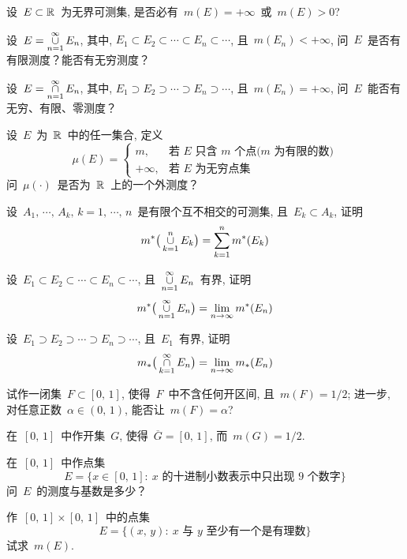 \begin{problemset}
\item 设~$E \subset \mathbb{R}$~为无界可测集, 是否必有~$m(E) = +\infty$~或~$m(E) > 0$?

\item 设~$E = \mathop{\cup}\limits_{n=1}^\infty E_n$, 其中, $E_1 \subset E_2 \subset \cdots \subset E_n \subset \cdots$, 且~$m(E_n) < +\infty$, 问~$E$~是否有有限测度？能否有无穷测度？

\item 设~$E = \mathop{\cap}\limits_{n=1}^\infty E_n$, 其中, $E_1 \supset E_2 \supset \cdots \supset E_n \supset \cdots$, 且~$m(E_n) = +\infty$, 问~$E$~能否有无穷、有限、零测度？

\item 设~$E$~为~$\mathbb{R}$~中的任一集合, 定义
\[
\mu(E) = \left\{\!\!
\begin{array}{cl}
m, & \mbox{若~} E \mbox{~只含~} m \mbox{~个点($m$~为有限的数)} \\[0.2cm]
+\infty, & \mbox{若~} E \mbox{~为无穷点集}
\end{array}
\right.
\]
问~$\mu(\cdot)$~是否为~$\mathbb{R}$~上的一个外测度？

\item 设~$A_1,\,\cdots,\,A_k, \, k=1,\,\cdots,\,n$~是有限个互不相交的可测集, 且~$E_k \subset A_k$, 证明
\[
m^*\big(\mathop{\cup}\limits_{k=1}^n E_k \big) = \sum\limits_{k=1}^n m^*(E_k)
\]

\item 设~$E_1 \subset E_2 \subset \cdots \subset E_n \subset \cdots$, 且~$\mathop{\cup}\limits_{n=1}^\infty E_n$~有界, 证明
\[
m^*\big(\mathop{\cup}\limits_{n=1}^\infty E_n \big) = \lim\limits_{n \to \infty} m^*(E_n)
\]

\item 设~$E_1 \supset E_2 \supset \cdots \supset E_n \supset \cdots$, 且~$E_1$~有界, 证明
\[
m_*\big(\mathop{\cap}\limits_{k=1}^\infty E_n \big) = \lim\limits_{n \to \infty} m_*(E_n)
\]

\item 试作一闭集~$F \subset [0,\,1]$, 使得~$F$~中不含任何开区间, 且~$m(F)=1/2$; 进一步, 对任意正数~$\alpha \in (0,\,1)$, 能否让~$m(F) = \alpha$?

\item 在~$[0,\,1]$~中作开集~$G$, 使得~$\overline{G} =[0,\,1]$, 而~$m(G) = 1/2$.

\item 在~$[0,\,1]$~中作点集
\[
E = \{x \in [0,\,1]:\: x \mbox{~的十进制小数表示中只出现~9~个数字}\}
\]
问~$E$~的测度与基数是多少？

\item 作~$[0,\,1] \times [0,\,1]$~中的点集
\[
E = \{(x,\,y):\: x \mbox{~与~} y \mbox{~至少有一个是有理数}\}
\]
试求~$m(E)$.


\end{problemset}
